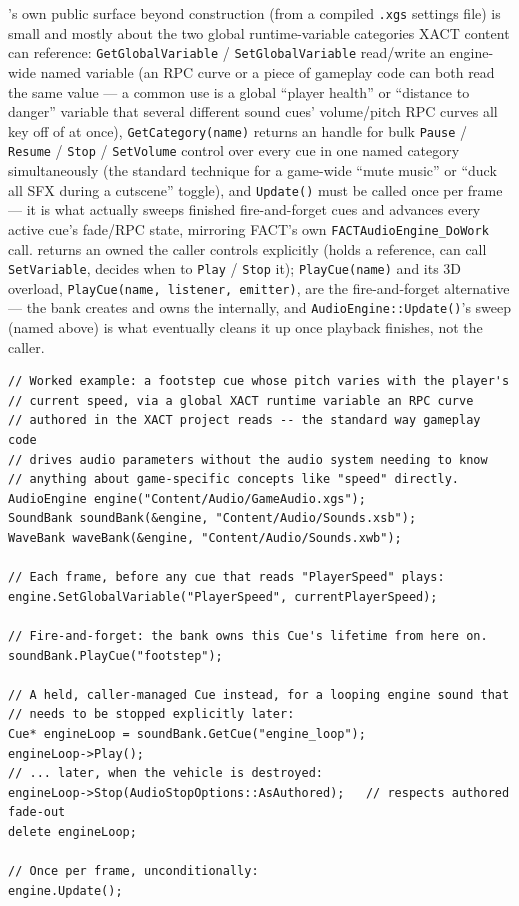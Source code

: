 's own public surface beyond construction (from a compiled
\texttt{.xgs} settings file) is small and mostly about the two global runtime-variable
categories XACT content can reference: \texttt{GetGlobalVariable} / \texttt{SetGlobalVariable}
read/write an engine-wide named variable (an RPC curve or a piece of gameplay code can both
read the same value --- a common use is a global ``player health'' or ``distance to danger''
variable that several different sound cues' volume/pitch RPC curves all key off of at once),
\texttt{GetCategory(name)} returns an  handle for bulk
\texttt{Pause} / \texttt{Resume} / \texttt{Stop} / \texttt{SetVolume} control over every cue in one
named category simultaneously (the standard technique for a game-wide ``mute music'' or
``duck all SFX during a cutscene'' toggle), and \texttt{Update()} must be called once per
frame --- it is what actually sweeps finished fire-and-forget cues and advances every active
cue's fade/RPC state, mirroring FACT's own \texttt{FACTAudioEngine\_DoWork} call.
 returns an owned  the caller controls
explicitly (holds a reference, can call \texttt{SetVariable}, decides when to
\texttt{Play} / \texttt{Stop} it); \texttt{PlayCue(name)} and its 3D overload,
\texttt{PlayCue(name, listener, emitter)}, are the fire-and-forget alternative --- the bank
creates and owns the  internally, and \texttt{AudioEngine::Update()}'s sweep
(named above) is what eventually cleans it up once playback finishes, not the caller.

\begin{lstlisting}
// Worked example: a footstep cue whose pitch varies with the player's
// current speed, via a global XACT runtime variable an RPC curve
// authored in the XACT project reads -- the standard way gameplay code
// drives audio parameters without the audio system needing to know
// anything about game-specific concepts like "speed" directly.
AudioEngine engine("Content/Audio/GameAudio.xgs");
SoundBank soundBank(&engine, "Content/Audio/Sounds.xsb");
WaveBank waveBank(&engine, "Content/Audio/Sounds.xwb");

// Each frame, before any cue that reads "PlayerSpeed" plays:
engine.SetGlobalVariable("PlayerSpeed", currentPlayerSpeed);

// Fire-and-forget: the bank owns this Cue's lifetime from here on.
soundBank.PlayCue("footstep");

// A held, caller-managed Cue instead, for a looping engine sound that
// needs to be stopped explicitly later:
Cue* engineLoop = soundBank.GetCue("engine_loop");
engineLoop->Play();
// ... later, when the vehicle is destroyed:
engineLoop->Stop(AudioStopOptions::AsAuthored);   // respects authored fade-out
delete engineLoop;

// Once per frame, unconditionally:
engine.Update();
\end{lstlisting}

